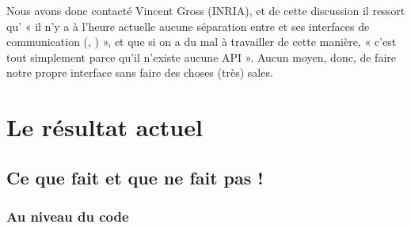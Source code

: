 		Nous avons donc contacté Vincent Gross (INRIA), et de cette discussion il ressort qu' « il n'y a à l'heure actuelle aucune séparation entre \coq{} et ses interfaces de communication (\coqtop{}, \coqide{}) », et que si on a du mal à travailler de cette manière, « c'est tout simplement parce qu'il n'existe aucune API ».
		Aucun moyen, donc, de faire notre propre interface sans faire des choses (très) sales.
				
\section{Le résultat actuel}

    \subsection{Ce que \coquille fait et que \coqide{} ne fait pas !}
    
        \subsubsection{Au niveau du code}
        
